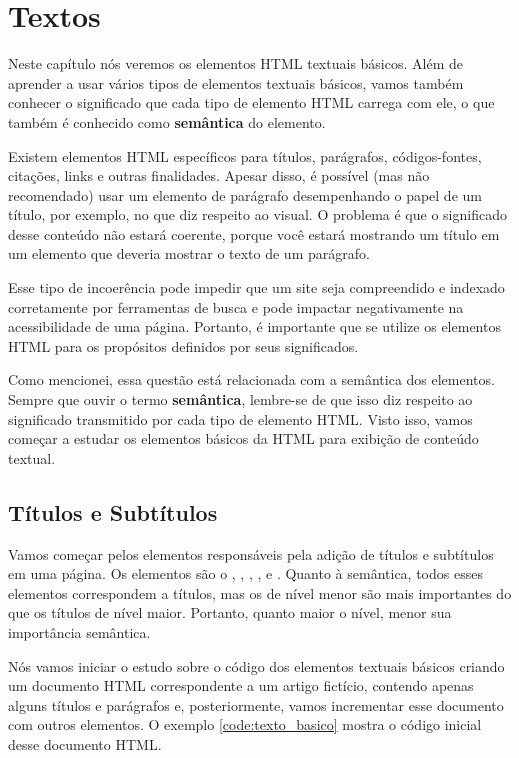 \chapter{Textos}

Neste capítulo nós veremos os elementos HTML textuais básicos. Além de aprender a usar vários tipos de elementos textuais básicos, vamos também conhecer o significado que cada tipo de elemento HTML carrega com ele, o que também é conhecido como \textbf{semântica} do elemento.

Existem elementos HTML específicos para títulos, parágrafos, códigos-fontes, citações, links e outras finalidades. Apesar disso, é possível (mas não recomendado) usar um elemento de parágrafo desempenhando o papel de um título, por exemplo, no que diz respeito ao visual. O problema é que o significado desse conteúdo não estará coerente, porque você estará mostrando um título em um elemento que deveria mostrar o texto de um parágrafo. 

Esse tipo de incoerência pode impedir que um site seja compreendido e indexado corretamente por ferramentas de busca e pode impactar negativamente na acessibilidade de uma página. Portanto, é importante que se utilize os elementos HTML para os propósitos definidos por seus significados.

Como mencionei, essa questão está relacionada com a semântica dos elementos. Sempre que ouvir o termo \textbf{semântica}, lembre-se de que isso diz respeito ao significado transmitido por cada tipo de elemento HTML. Visto isso, vamos começar a estudar os elementos básicos da HTML para exibição de conteúdo textual.

\section{Títulos e Subtítulos}

Vamos começar pelos elementos responsáveis pela adição de títulos e subtítulos em uma página. Os elementos são o , , , ,  e . Quanto à semântica, todos esses elementos correspondem a títulos, mas os de nível menor são mais importantes do que os títulos de nível maior. Portanto, quanto maior o nível, menor sua importância semântica.

Nós vamos iniciar o estudo sobre o código dos elementos textuais básicos criando um documento HTML correspondente a um artigo fictício, contendo apenas alguns títulos e parágrafos e, posteriormente, vamos incrementar esse documento com outros elementos. O exemplo \ref{code:texto_basico} mostra o código inicial desse documento HTML.


